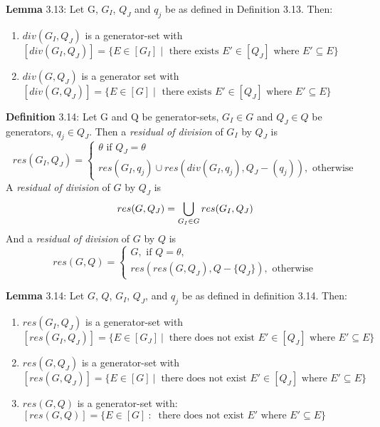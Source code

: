 \documentclass{article}
\begin{document}
\par 
\textbf{Lemma} 3.13: Let G, $G_I$, $Q_J$ and $q_j$ be as defined in Definition
3.13.  Then:
\begin{enumerate}[label={(\alph*)}]
  \item $div(G_I, Q_J)$ is a generator-set with $[div(G_I, Q_J)] = \{ E \in
  [G_I]\;|\; \text{ there exists } E' \in [Q_J] \text{ where } E' \subseteq E
  \}$
  \item $div(G, Q_J)$ is a generator set with $[div(G, Q_J)] = \{ E \in [G]
  \;|\; \text{ there exists } E' \in [Q_J] \text{ where } E' \subseteq E \}$
\end{enumerate}

\par 
\textbf{Definition} 3.14: Let G and Q be generator-sets, $G_I \in G$ and $Q_J
\in Q$ be generators, $q_j \in Q_J$. Then a \textit{ residual of division} of
$G_I$ by $Q_J$ is
\[
 res(G_I, Q_J) = \begin{cases}
 \theta \text{ if } Q_J = \theta \\
 res(G_I, q_j) \cup res( div( G_I, q_j), Q_J - (q_j)), \text{ otherwise}
 \end{cases}
\]
\newline
A \textit{residual of division} of $G$ by $Q_J$ is
\[
    res( G, Q_J) = \bigcup\limits_{G_I \in G} res(G_I, Q_J)\\
\]
\newline
And a \textit{residual of division} of $G$ by $Q$ is
\[
res( G, Q) = \begin{cases}
  G, \text{ if } Q= \theta, \\
  res( res( G, Q_J), Q- \{Q_J\}), \text{ otherwise}
\end{cases}
\]
\newline

\par 
\textbf{Lemma} 3.14: Let $G$, $Q$, $G_I$, $Q_J$, and $q_j$ be as defined in
definition 3.14. Then:
\begin{enumerate}[label={(\alph*)}]
  \item $res( G_I, Q_J)$ is a generator-set with \newline $[res(G_I, Q_J)] = \{
   E \in [G_J] \:|\: \text{ there does not exist } E' \in [Q_J] \text{ where }
   E' \subseteq E \}$
  \item $res( G, Q_J)$ is a generator-set with $[res(G, Q_J)] = \{ E \in [G]
  \:|\: \text{ there does not exist } E' \in [Q_J] \text{ where } E' \subseteq E
  \}$
  \item $res( G, Q)$ is a generator-set with: $[res(G, Q)] = \{ E \in [G] \::\:
  \text{ there does not exist } E' \text{ where } E' \subseteq E \}$
\end{enumerate}
\end{document}
